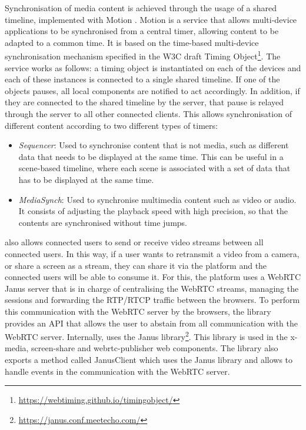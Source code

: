 Synchronisation of media content is achieved through the usage of a shared timeline, implemented with Motion \citep{boronat2017hybrid, montagud2018mediasync}. Motion is a service that allows multi-device applications to be synchronised from a central timer, allowing content to be adapted to a common time. It is based on the time-based multi-device synchronisation mechanism specified in the W3C draft Timing Object\footnote{\url{https://webtiming.github.io/timingobject/}}.
The service works as follows: a timing object is instantiated on each of the devices and each of these instances is connected to a single shared timeline. If one of the objects pauses, all local components are notified to act accordingly. In addition, if they are connected to the shared timeline by the server, that pause is relayed through the server to all other connected clients.
This allows synchronisation of different content according to two different types of timers:
\begin{itemize}
    \item \textit{Sequencer}: Used to synchronise content that is not media, such as different data that needs to be displayed at the same time. This can be useful in a scene-based timeline, where each scene is associated with a set of data that has to be displayed at the same time.
    \item \textit{MediaSynch}: Used to synchronise multimedia content such as video or audio. It consists of adjusting the playback speed with high precision, so that the contents are synchronised without time jumps.
\end{itemize}

\ork{} also allows connected users to send or receive video streams between all connected users. In this way, if a user wants to retransmit a video from a camera, or share a screen as a stream, they can share it via the platform and the connected users will be able to consume it. For this, the platform uses a WebRTC Janus server that is in charge of centralising the WebRTC streams, managing the sessions and forwarding the RTP/RTCP traffic between the browsers. To perform this communication with the WebRTC server by the browsers, the library provides an API that allows the user to abstain from all communication with the WebRTC server. Internally, \ork{} uses the Janus library\footnote{\url{https://janus.conf.meetecho.com/}}. This library is used in the x-media, screen-share and webrtc-publisher web components. The library also exports a method called JanusClient which uses the Janus library and allows to handle events in the communication with the WebRTC server.

